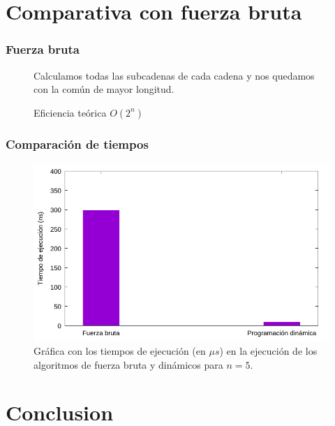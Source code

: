 \documentclass[13pt]{beamer}
\begin{document}
	\section{Comparativa con fuerza bruta}
	
	\begin{frame}
		\frametitle{Fuerza bruta}
		\begin{figure}
			Calculamos todas las subcadenas de cada cadena y nos quedamos con la
			común de mayor longitud.
			
			\begin{block}{Eficiencia teórica}
				\centering
				$O(2^{n})$
			\end{block}
			
		\end{figure}
	\end{frame}

    \begin{frame}
		\frametitle{Comparación de tiempos}
		\begin{figure}[h]
            \centering
            \includegraphics[scale=0.7]{comparativa.pdf}
            \caption{Gráfica con los tiempos de ejecución (en $\mu s$) en la ejecución de los algoritmos de fuerza bruta
            y dinámicos para $n=5$. }
            \label{graph:comp}
          \end{figure}
	\end{frame}
	
	\section{Conclusion}
\end{document}
